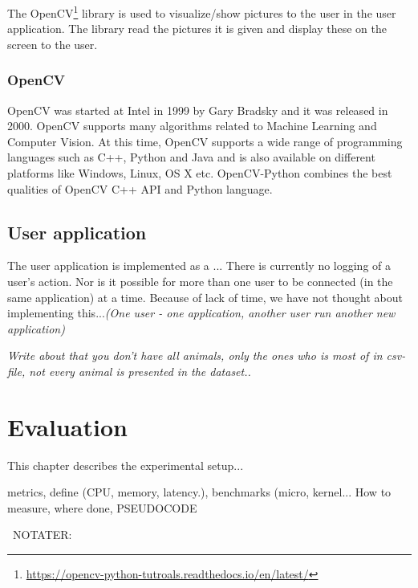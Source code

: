 \documentclass[USenglish]{uit-thesis}
\begin{document}
The OpenCV\footnote{\url{https://opencv-python-tutroals.readthedocs.io/en/latest/}} library is used to visualize/show pictures to the user in the user application. The library read the pictures it is given and display these on the screen to the user.

\subsection{OpenCV}
OpenCV was started at Intel in 1999 by Gary Bradsky and it was released in 2000. OpenCV supports many algorithms related to Machine Learning and Computer Vision. 
At this time, OpenCV supports a wide range of programming languages such as C++, Python and Java and is also available on different platforms like Windows, Linux, OS X etc. OpenCV-Python combines the best qualities of OpenCV C++ API and Python language.


\section{User application} \label{sssec:user}
The user application is implemented as a ...
There is currently no logging of a user's action. Nor is it possible for more than one user to be connected (in the same application) at a time. Because of lack of time, we have not thought about implementing this...\textit{(One user - one application, another user run another new application)}

\textit{Write about that you don't have all animals, only the ones who is most of in csv-file, not every animal is presented in the dataset..}


\chapter{Evaluation} 
This chapter describes the experimental setup...

metrics, define (CPU, memory, latency.), benchmarks (micro, kernel...
How to measure, where done, PSEUDOCODE

\ NOTATER:
\end{document}
